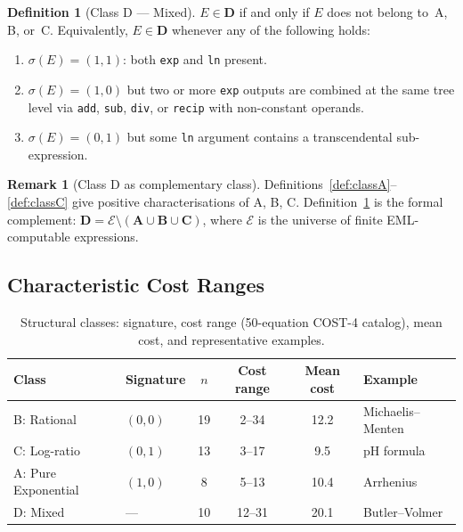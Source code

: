 \documentclass[12pt,a4paper]{article}
\theoremstyle{definition}
\newtheorem{definition}[theorem]{Definition}
\newtheorem{remark}[theorem]{Remark}
\begin{document}
\begin{definition}[Class D --- Mixed]
\label{def:classD}
$E \in \mathbf{D}$ if and only if $E$ does not belong to~A, B, or~C.
Equivalently, $E \in \mathbf{D}$ whenever any of the following holds:
\begin{enumerate}
  \item $\sigma(E) = (1,1)$: both \texttt{exp} and \texttt{ln} present.
  \item $\sigma(E) = (1,0)$ but two or more \texttt{exp} outputs are
        combined at the same tree level via \texttt{add}, \texttt{sub},
        \texttt{div}, or \texttt{recip} with non-constant operands.
  \item $\sigma(E) = (0,1)$ but some \texttt{ln} argument contains a
        transcendental sub-expression.
\end{enumerate}
\end{definition}

\begin{remark}[Class D as complementary class]
Definitions~\ref{def:classA}--\ref{def:classC} give positive
characterisations of A, B, C.
Definition~\ref{def:classD} is the formal complement: $\mathbf{D}
= \mathcal{E} \setminus (\mathbf{A} \cup \mathbf{B} \cup \mathbf{C})$,
where $\mathcal{E}$ is the universe of finite EML-computable expressions.
\end{remark}

\subsection{Characteristic Cost Ranges}

\begin{table}[h]
\centering
\caption{Structural classes: signature, cost range (50-equation COST-4
         catalog), mean cost, and representative examples.}
\label{tab:classes}
\smallskip
\begin{tabular}{@{}llcccl@{}}
\toprule
\textbf{Class} & \textbf{Signature}
  & \textbf{$n$}
  & \textbf{Cost range}
  & \textbf{Mean cost}
  & \textbf{Example} \\
\midrule
B: Rational          & $(0,0)$ & 19 & 2--34  & 12.2 & Michaelis--Menten \\
C: Log-ratio         & $(0,1)$ & 13 & 3--17  & 9.5  & pH formula \\
A: Pure Exponential  & $(1,0)$ & 8  & 5--13  & 10.4 & Arrhenius \\
D: Mixed             & ---     & 10 & 12--31 & 20.1 & Butler--Volmer \\
\bottomrule
\end{tabular}
\end{table}
\end{document}
